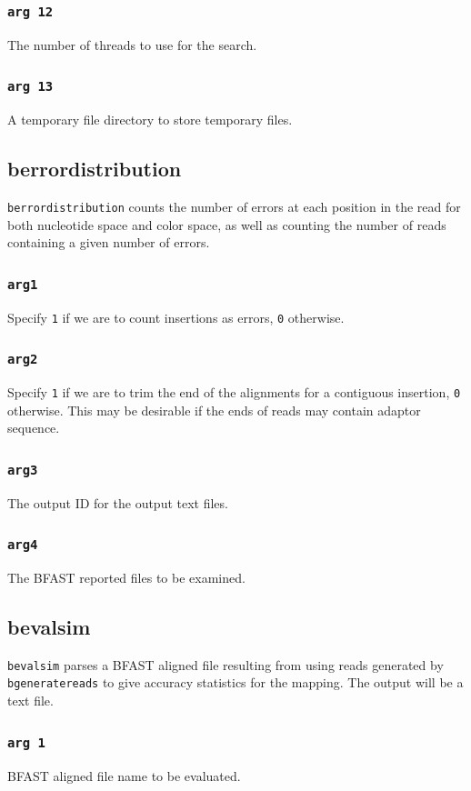 \documentclass[a4paper,12pt]{book}
\newcommand{\TT}[1]{{\tt #1}} %
\newcommand{\BAF}{BFAST aligned file} %
\newcommand{\BRF}{BFAST reported file} %
\begin{document}
\subsubsection{\TT{arg 12}}
The number of threads to use for the search.
\subsubsection{\TT{arg 13}}
A temporary file directory to store temporary files.


\subsection{berrordistribution}
\label{sec:berrordistribution}
\TT{berrordistribution} counts the number of errors at each position in the read for both nucleotide space and color space, as well as counting the number of reads containing a given number of errors.

\subsubsection{\TT{arg1}}
Specify \TT{1} if we are to count insertions as errors, \TT{0} otherwise.
\subsubsection{\TT{arg2}}
Specify \TT{1} if we are to trim the end of the alignments for a contiguous insertion, \TT{0} otherwise.
This may be desirable if the ends of reads may contain adaptor sequence. 
\subsubsection{\TT{arg3}}
The output ID for the output text files.
\subsubsection{\TT{arg4}}
The \BRF{s} to be examined.


\subsection{bevalsim}
\label{sec:bevalsim}
\TT{bevalsim} parses a \BAF{} resulting from using reads generated by \TT{bgeneratereads} to give accuracy statistics for the mapping.
The output will be a text file.

\subsubsection{\TT{arg 1}}
\BAF{} name to be evaluated.
\end{document}
